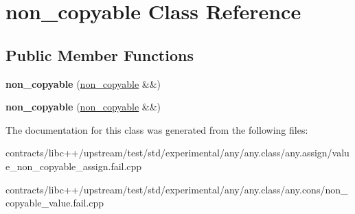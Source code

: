 \hypertarget{classnon__copyable}{}\section{non\+\_\+copyable Class Reference}
\label{classnon__copyable}
\subsection*{Public Member Functions}
\begin{DoxyCompactItemize}
\item 
\mbox{\label{classnon__copyable_af80976eeb5fc41900a4e724193f9f312}} 
{\bfseries non\+\_\+copyable} (\mbox{\hyperlink{classnon__copyable}{non\+\_\+copyable}} \&\&)
\item 
\mbox{\label{classnon__copyable_af80976eeb5fc41900a4e724193f9f312}} 
{\bfseries non\+\_\+copyable} (\mbox{\hyperlink{classnon__copyable}{non\+\_\+copyable}} \&\&)
\end{DoxyCompactItemize}


The documentation for this class was generated from the following files\+:\begin{DoxyCompactItemize}
\item 
contracts/libc++/upstream/test/std/experimental/any/any.\+class/any.\+assign/value\+\_\+non\+\_\+copyable\+\_\+assign.\+fail.\+cpp\item 
contracts/libc++/upstream/test/std/experimental/any/any.\+class/any.\+cons/non\+\_\+copyable\+\_\+value.\+fail.\+cpp\end{DoxyCompactItemize}
